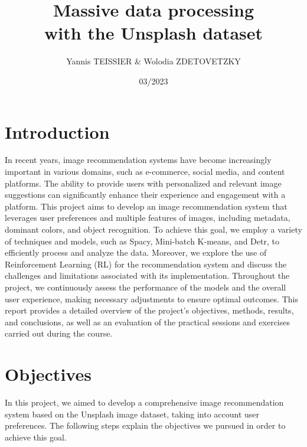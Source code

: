 \documentclass{article}
\title{Massive data processing \\ with the Unsplash dataset}
\author{Yannis TEISSIER \& Wolodia ZDETOVETZKY}
\date{03/2023}
\begin{document}
    \maketitle
    \tableofcontents
    \newpage


    \section{Introduction}\label{sec:introduction}

    In recent years, image recommendation systems have become increasingly important in various domains, such as e-commerce, social media, and content platforms.
    The ability to provide users with personalized and relevant image suggestions can significantly enhance their experience and engagement with a platform.
    This project aims to develop an image recommendation system that leverages user preferences and multiple features of images, including metadata, dominant colors, and object recognition.
    To achieve this goal, we employ a variety of techniques and models, such as Spacy, Mini-batch K-means, and Detr, to efficiently process and analyze the data.
    Moreover, we explore the use of Reinforcement Learning (RL) for the recommendation system and discuss the challenges and limitations associated with its implementation.
    Throughout the project, we continuously assess the performance of the models and the overall user experience, making necessary adjustments to ensure optimal outcomes.
    This report provides a detailed overview of the project's objectives, methods, results, and conclusions, as well as an evaluation of the practical sessions and exercises carried out during the course.


    \section{Objectives}\label{sec:objectives}

    In this project, we aimed to develop a comprehensive image recommendation system based on the Unsplash image dataset, taking into account user preferences.
    The following steps explain the objectives we pursued in order to achieve this goal.
\end{document}
